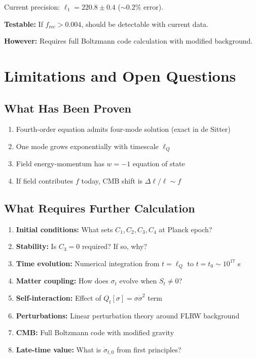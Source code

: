 \documentclass[11pt,a4paper]{article}
\theoremstyle{definition}
\theoremstyle{remark}
\begin{document}
	Current precision: $\ell_1 = 220.8 \pm 0.4$ ($\sim 0.2\%$ error).
	
	\textbf{Testable:} If $f_{\text{rec}} > 0.004$, should be detectable with current data.
	
	\textbf{However:} Requires full Boltzmann code calculation with modified background.
	
	\section{Limitations and Open Questions}
	
	\subsection{What Has Been Proven}
	
	\begin{enumerate}
		\item Fourth-order equation admits four-mode solution (exact in de Sitter)
		\item One mode grows exponentially with timescale $\ell_Q$
		\item Field energy-momentum has $w = -1$ equation of state
		\item If field contributes $f$ today, CMB shift is $\Delta \ell/\ell \sim f$
	\end{enumerate}
	
	\subsection{What Requires Further Calculation}
	
	\begin{enumerate}
		\item \textbf{Initial conditions:} What sets $C_1, C_2, C_3, C_4$ at Planck epoch?
		
		\item \textbf{Stability:} Is $C_3 = 0$ required? If so, why?
		
		\item \textbf{Time evolution:} Numerical integration from $t = \ell_Q$ to $t = t_0 \sim 10^{17}$ s
		
		\item \textbf{Matter coupling:} How does $\sigma_t$ evolve when $S_t \neq 0$?
		
		\item \textbf{Self-interaction:} Effect of $Q_t[\sigma] = \sigma\dot{\sigma}^2$ term
		
		\item \textbf{Perturbations:} Linear perturbation theory around FLRW background
		
		\item \textbf{CMB:} Full Boltzmann code with modified gravity
		
		\item \textbf{Late-time value:} What is $\dot{\sigma}_{t,0}$ from first principles?
	\end{enumerate}
	
\end{document}
